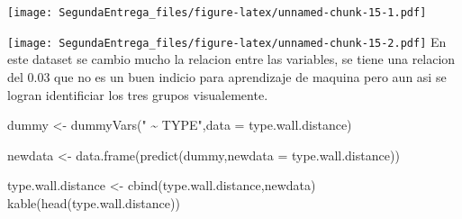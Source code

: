 \documentclass[
]{article}
\newenvironment{Shaded}{\begin{snugshade}}{\end{snugshade}}
\newcommand{\AttributeTok}[1]{\textcolor[rgb]{0.77,0.63,0.00}{#1}}
\newcommand{\DecValTok}[1]{\textcolor[rgb]{0.00,0.00,0.81}{#1}}
\newcommand{\FunctionTok}[1]{\textcolor[rgb]{0.00,0.00,0.00}{#1}}
\newcommand{\NormalTok}[1]{#1}
\newcommand{\OtherTok}[1]{\textcolor[rgb]{0.56,0.35,0.01}{#1}}
\newcommand{\SpecialCharTok}[1]{\textcolor[rgb]{0.00,0.00,0.00}{#1}}
\newcommand{\StringTok}[1]{\textcolor[rgb]{0.31,0.60,0.02}{#1}}
\begin{document}
\texttt{[image: SegundaEntrega\_files/figure-latex/unnamed-chunk-15-1.pdf]}

\begin{Shaded}
\end{Shaded}

\texttt{[image: SegundaEntrega\_files/figure-latex/unnamed-chunk-15-2.pdf]}
En este dataset se cambio mucho la relacion entre las variables, se
tiene una relacion del 0.03 que no es un buen indicio para aprendizaje
de maquina pero aun asi se logran identificiar los tres grupos
visualemente.

\begin{Shaded}
\begin{Highlighting}[]
\NormalTok{dummy }\OtherTok{\textless{}{-}} \FunctionTok{dummyVars}\NormalTok{(}\StringTok{" \textasciitilde{} TYPE"}\NormalTok{,}\AttributeTok{data =}\NormalTok{ type.wall.distance)}

\NormalTok{newdata }\OtherTok{\textless{}{-}} \FunctionTok{data.frame}\NormalTok{(}\FunctionTok{predict}\NormalTok{(dummy,}\AttributeTok{newdata =}\NormalTok{ type.wall.distance))}

\NormalTok{type.wall.distance }\OtherTok{\textless{}{-}} \FunctionTok{cbind}\NormalTok{(type.wall.distance,newdata)}
\FunctionTok{kable}\NormalTok{(}\FunctionTok{head}\NormalTok{(type.wall.distance))}
\end{Highlighting}
\end{Shaded}
\end{document}
